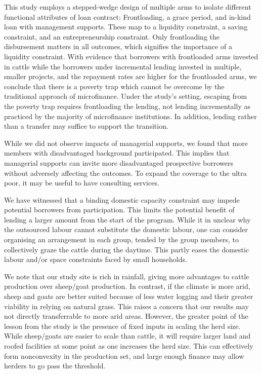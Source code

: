 	This study employs a stepped-wedge design of multiple arms to isolate different functional attributes of loan contract: Frontloading, a grace period, and in-kind loan with management supports. These map to a liquidity constraint, a saving constraint, and an entrepreneurship constraint. Only frontloading the disbursement matters in all outcomes, which signifies the importance of a liquidity constraint. With evidence that borrowers with frontloaded arms invested in cattle while the borrowers under incremental lending invested in multiple, smaller projects, and the repayment rates are higher for the frontloaded arms, we conclude that there is a poverty trap which cannot be overcome by the traditional approach of microfinance. Under the study's setting, escaping from the poverty trap requires frontloading the lending, not lending incrementally as practiced by the majority of microfinance institutions. In addition, lending rather than a transfer may suffice to support the transition. 
	
	While we did not observe impacts of managerial supports, we found that more members with disadvantaged background participated. This implies that managerial supports can invite more disadvantaged prospective borrowers without adversely affecting the outcomes. To expand the coverage to the ultra poor, it may be useful to have consulting services.
	
	We have witnessed that a binding domestic capacity constraint may impede potential borrowers from participation. This limits the potential benefit of lending a larger amount from the start of the program. While it in unclear why the outsourced labour cannot substitute the domestic labour, one can consider organising an arrangement in each group, tended by the group members, to collectively graze the cattle during the daytime. This partly eases the domestic labour and/or space constraints faced by small households. 

	We note that our study site is rich in rainfall, giving more advantages to cattle production over sheep/goat production. In contrast, if the climate is more arid, sheep and goats are better suited because of less water logging and their greater viability in relying on natural grass. This raises a concern that our results may not directly transferrable to more arid areas. However, the greater point of the lesson from the study is the presence of fixed inputs in scaling the herd size. While sheep/goats are easier to scale than cattle, it will require larger land and roofed facilities at some point as one increases the herd size. This can effectively form nonconvexity in the production set, and large enough finance may allow herders to go pass the threshold. 

